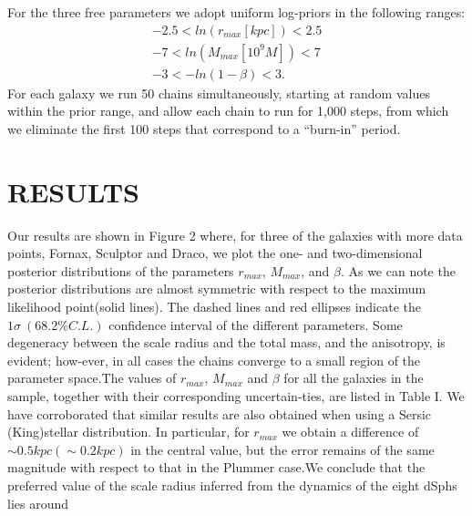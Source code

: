 \documentclass{article}
\begin{document}
\begin{multicols}{2}
For  the  three  free  parameters  we  adopt  uniform  log-priors in the following ranges:
\begin{eqnarray}
−2.5<ln(r_{max}[kpc])<2.5\\
−7<ln(M_{max}[10^9M])<7\\
−3<−ln (1−\beta)<3.   
\end{eqnarray}
For each galaxy we run 50 chains simultaneously, starting at random values within the prior range, and allow each chain to run for 1,000 steps, from which we eliminate the first 100 steps that correspond to a “burn-in” period.
\section{RESULTS}
Our  results  are  shown  in  Figure  2  where,  for  three of the galaxies with more data points, Fornax, Sculptor and  Draco,  we  plot  the  one-  and  two-dimensional  posterior  distributions  of  the  parameters $r_{max}$, $M_{max}$,  and $\beta$.  As we can note the posterior distributions are almost symmetric with respect to the maximum likelihood point(solid lines).  The dashed lines and red ellipses indicate the $1\sigma~(68.2\% C.L.)$ confidence interval of the different parameters.  Some degeneracy between the scale radius and the total mass, and the anisotropy, is evident; how-ever, in all cases the chains converge to a small region of the parameter space.The values of $r_{max}$, $M_{max}$ and $\beta$ for all the galaxies in the sample, together with their corresponding uncertain-ties, are listed in Table I. We have corroborated that similar results are also obtained when using a Sersic (King)stellar distribution.  In particular,  for $r_{max}$ we obtain a difference  of $\sim0.5 kpc  (\sim0.2kpc)$  in  the  central  value, but  the  error  remains  of  the  same  magnitude  with  respect to that in the Plummer case.We conclude that the preferred value of the scale radius inferred from the dynamics of the eight dSphs lies around
\end{multicols}
\end{document}
